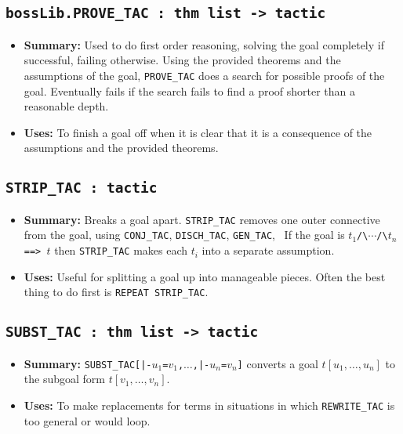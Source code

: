 \subsection{\tt bossLib.PROVE\_TAC : thm list -> tactic}

\begin{itemize}
\item {\bf Summary:} Used to do first order reasoning, solving the
  goal completely if successful, failing otherwise.  Using the
  provided theorems and the assumptions of the goal,
  {\small\verb|PROVE_TAC|} does a search for possible proofs of the
  goal.  Eventually fails if the search fails to find a proof shorter
  than a reasonable depth.
\item {\bf Uses:} To finish a goal off when it is clear that it is a
  consequence of the assumptions and the provided theorems.
\end{itemize}


\subsection{\tt STRIP\_TAC : tactic}

\begin{itemize}

\item{\bf Summary:} Breaks a goal apart.  {\small\verb|STRIP_TAC|}
  removes one outer connective from the goal, using
  {\small\verb|CONJ_TAC|}, {\small\verb|DISCH_TAC|},
  {\small\verb|GEN_TAC|}, \etc\ If the goal is
$t_1${\small\verb|/\|}$\cdots${\small\verb|/\|}$t_n${\small\verb| ==> |}$t$
then {\small\verb|STRIP_TAC|} makes each $t_i$ into a separate assumption.

\item{\bf Uses:} Useful for splitting a goal up into manageable pieces.
Often the best thing to do first is {\small\verb|REPEAT STRIP_TAC|}.
\end{itemize}

\subsection{\tt SUBST\_TAC : thm list -> tactic}

\begin{itemize}

\item{\bf Summary:}
  {\small\verb+SUBST_TAC[|-+}$u_1${\small\verb|=|}$v_1${\small\verb|,|}$\ldots${\small\verb+,|-+}$u_n${\small\verb|=|}$v_n${\small\verb|]|}
  converts a goal $t[u_1,\ldots ,u_n]$ to the subgoal form
  $t[v_1,\ldots ,v_n]$.

\item{\bf Uses:} To make replacements for terms in situations in which
  {\small\verb|REWRITE_TAC|} is too general or would loop.
\end{itemize}


